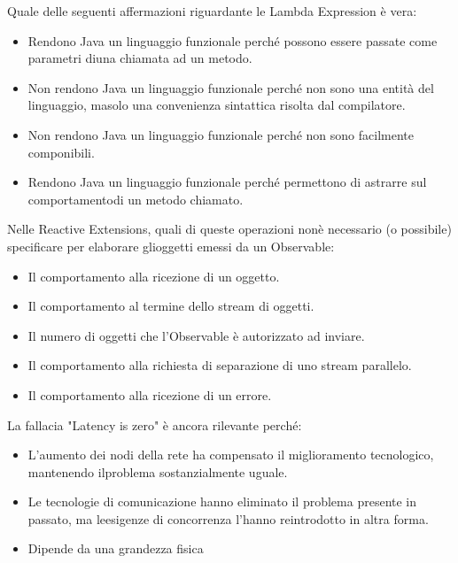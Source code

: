 \documentclass{article}
\begin{document}
Quale delle seguenti affermazioni riguardante le Lambda Expression è vera:

\begin{itemize}
	\item Rendono Java un linguaggio funzionale perché possono essere passate come parametri diuna chiamata ad un metodo.
	\item \checkmark Non rendono Java un linguaggio funzionale perché non sono una entità del linguaggio, masolo una convenienza sintattica risolta dal compilatore.
	\item Non rendono Java un linguaggio funzionale perché non sono facilmente componibili.
	\item Rendono Java un linguaggio funzionale perché permettono di astrarre sul comportamentodi un metodo chiamato.
\end{itemize}

Nelle Reactive Extensions, quali di queste operazioni nonè necessario (o possibile) specificare per elaborare glioggetti emessi da un Observable:

\begin{itemize}
	\item Il comportamento alla ricezione di un oggetto.
	\item Il comportamento al termine dello stream di oggetti.
	\item \checkmark Il numero di oggetti che l'Observable è autorizzato ad inviare.
	\item \checkmark Il comportamento alla richiesta di separazione di uno stream parallelo.
	\item Il comportamento alla ricezione di un errore.
\end{itemize}

La fallacia "Latency is zero" è ancora rilevante perché:
\begin{itemize}
	\item L'aumento dei nodi della rete ha compensato il miglioramento tecnologico, mantenendo ilproblema sostanzialmente uguale.
	\item Le tecnologie di comunicazione hanno eliminato il problema presente in passato, ma leesigenze di concorrenza l'hanno reintrodotto in altra forma.
	\item \checkmark Dipende da una grandezza fisica
\end{itemize}
\end{document}
